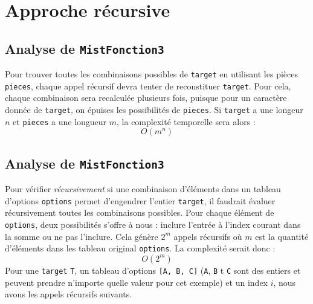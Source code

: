 \documentclass[9pt]{report}
\begin{document}
  \section{Approche récursive}
  \subsection{Analyse de {\texttt{MistFonction3}}}
  Pour trouver toutes les combinaisons possibles de \texttt{target} en utilisant les 
  pièces \texttt{pieces}, chaque appel récursif devra tenter de reconstituer 
  \texttt{target}. Pour cela, chaque combinaison sera recalculée plusieurs fois, 
  puisque pour un caractère donnée de \texttt{target}, on épuises les 
  possibilités de \texttt{pieces}. Si \texttt{target} a une longeur $n$ 
  et \texttt{pieces} a une longueur $m$, la complexité temporelle sera alors :
  \[ O(m^n) \]




  \subsection{Analyse de {\texttt{MistFonction3}}}
  Pour vérifier \textit{récursivement}   
  si une combinaison d'éléments dans un tableau d'options \texttt{options} 
  permet d'engendrer l'entier \texttt{target}, il faudrait évaluer 
  récursivement toutes les combinaisons possibles. Pour chaque élément 
  de \texttt{options}, deux possibilités s'offre à nous : inclure l'entrée à l'index 
  courant dans la somme ou ne pas l'inclure. Cela génère $2^m$ appels récursifs 
  où $m$ est la quantité d'éléments dans les tableau original \texttt{options}.   
  La complexité serait donc :
  \[ O(2^m) \]
  Pour une \texttt{target} \texttt{T}, un tableau d'options \texttt{[A, B, C]} 
  (\texttt{A}, \texttt{B} t \texttt{C} sont des entiers et peuvent prendre n'importe quelle 
  valeur pour cet exemple) et un 
  index $i$, nous avons les appels récursifs suivants. 


\end{document}
